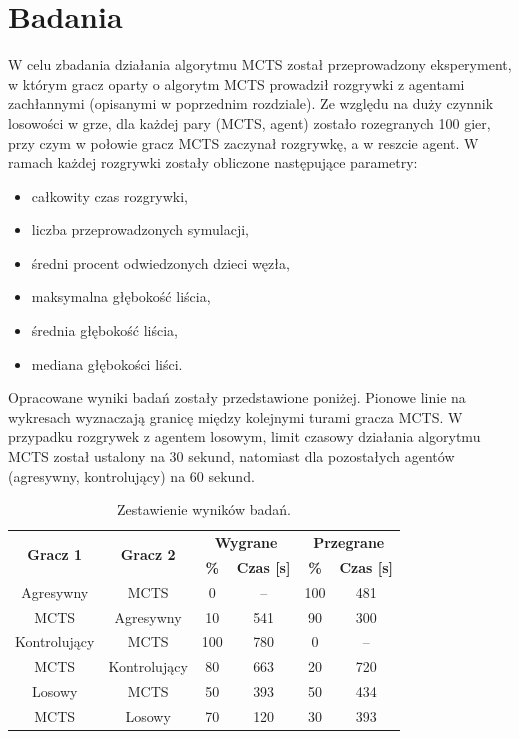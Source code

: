 \pagebreak
\section{Badania}
  W celu zbadania działania algorytmu MCTS został przeprowadzony eksperyment, w którym gracz 
  oparty o algorytm MCTS prowadził rozgrywki z agentami zachłannymi (opisanymi w poprzednim 
  rozdziale). Ze względu na duży czynnik losowości w grze, dla każdej pary (MCTS, agent) zostało
  rozegranych 100 gier, przy czym w połowie gracz MCTS zaczynał rozgrywkę, a w reszcie agent.
  W ramach każdej rozgrywki zostały obliczone następujące parametry:
  \begin{itemize}
    \item{całkowity czas rozgrywki,}
    \item{liczba przeprowadzonych symulacji,}
    \item{średni procent odwiedzonych dzieci węzła,}
    \item{maksymalna głębokość liścia,}
    \item{średnia głębokość liścia,}
    \item{mediana głębokości liści.}
  \end{itemize}

  Opracowane wyniki badań zostały przedstawione poniżej. Pionowe linie na wykresach wyznaczają
  granicę między kolejnymi turami gracza MCTS. W przypadku rozgrywek z agentem losowym, limit 
  czasowy działania algorytmu MCTS został ustalony na 30 sekund, natomiast dla pozostałych agentów
  (agresywny, kontrolujący) na 60 sekund.

  \begin{table}[H]
          \centering
          \begin{tabular}{|c|c|c|c|c|c|}
                  \hline
                  \multirow{2}{*}{\textbf{Gracz 1}} & \multirow{2}{*}{\textbf{Gracz 2}} & \multicolumn{2}{|c|}{\textbf{Wygrane}} & \multicolumn{2}{|c|}{\textbf{Przegrane}} \\
                  \cline{3-6}
                  & & \textbf{\%} & \textbf{Czas [s]} & \textbf{\%} & \textbf{Czas [s]} \\
                  \hline
                  Agresywny & MCTS & 0 & -- & 100 & 481 \\
                  \hline
                  MCTS & Agresywny & 10 & 541 & 90 & 300  \\
                  \hline \hline
                  Kontrolujący & MCTS & 100 & 780 & 0 & --  \\
                  \hline
                  MCTS & Kontrolujący & 80 & 663 & 20 & 720 \\
                  \hline \hline
                  Losowy & MCTS & 50 & 393 & 50 & 434 \\
                  \hline
                  MCTS & Losowy & 70 & 120 & 30 & 393 \\ 
                  \hline
          \end{tabular}
          \caption{Zestawienie wyników badań.}
  \end{table}

